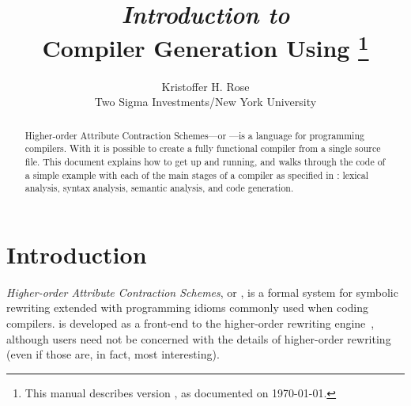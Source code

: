 \documentclass[11pt]{article} %
\title{
  \emph{Introduction to}\\
  Compiler Generation Using \HAX%
  \thanks{This manual describes \HAX version \version, as documented on \today.}
}
\author{
  Kristoffer H. Rose\\
  Two Sigma Investments/New York University
}
\begin{document}
\maketitle

\begin{abstract}\noindent
  Higher-order Attribute Contraction Schemes---or \HAX---is a language for programming compilers.
  With \HAX it is possible to create a fully functional compiler from a single source file.  This
  document explains how to get \HAX up and running, and walks through the code of a simple example
  with each of the main stages of a compiler as specified in \HAX: lexical analysis, syntax
  analysis, semantic analysis, and code generation.
\end{abstract}

\compacttableofcontents


\section{Introduction}\label{sec:intro}

\emph{Higher-order Attribute Contraction Schemes}, or \HAX, is a formal system for symbolic
rewriting extended with programming idioms commonly used when coding compilers. \HAX is developed as
a front-end to the \CRSX higher-order rewriting engine~\cite{crsx}, although \HAX users need not be
concerned with the details of higher-order rewriting (even if those are, in fact, most interesting).
\end{document}
